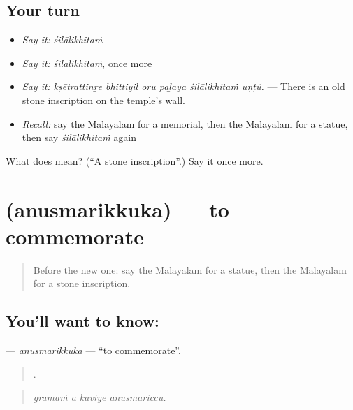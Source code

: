 \subsection*{Your turn}
\begin{itemize}
\raggedright
  \item \emph{Say it:} \emph{śilālikhitaṁ}
  \item \emph{Say it:} \emph{śilālikhitaṁ}, once more
  \item \emph{Say it:} \emph{kṣētrattinṟe bhittiyil oru paḻaya śilālikhitaṁ uṇṭŭ.} — There is an old stone inscription on the temple's wall.
  \item \emph{Recall:} say the Malayalam for a memorial, then the Malayalam for a statue, then say \emph{śilālikhitaṁ} again
\end{itemize}

\begin{tcolorbox}[breakable,colback=teal!4,colframe=teal!35!black,title={Before you move on}]
What does  mean? (\textquotedblleft{}A stone inscription\textquotedblright{}.) Say it once more.
\end{tcolorbox}
\section[\texorpdfstring{\ml{അനുസ്മരിക്കുക} (anusmarikkuka)}{അനുസ്മരിക്കുക (anusmarikkuka)}]{ (anusmarikkuka) — to commemorate}

\label{lesson:ML-C393-anusmarikkuka}



\begin{quote}
Before the new one: say the Malayalam for a statue, then the Malayalam for a stone inscription.
\end{quote}

\subsection*{You'll want to know: }
\textbf{} — \emph{anusmarikkuka} — \textquotedblleft{}to commemorate\textquotedblright{}.

\begin{quote}
   .
\end{quote}

\begin{quote}
\emph{grāmaṁ ā kaviye anusmariccu.}
\end{quote}

